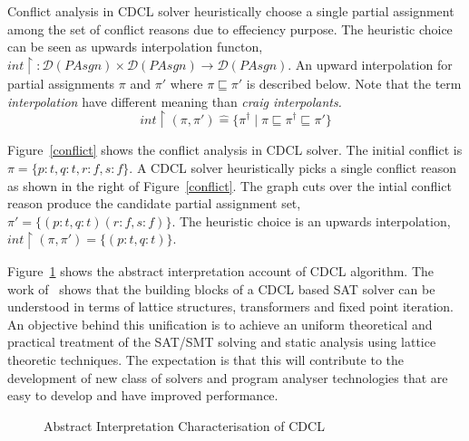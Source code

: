 Conflict analysis in CDCL solver heuristically choose a single partial
assignment among the set of conflict reasons due to effeciency purpose.
The heuristic choice can be seen as upwards interpolation functon, 
$int \upharpoonright \colon \mathcal{D}(PAsgn) \times \mathcal{D}(PAsgn)
\rightarrow \mathcal{D}(PAsgn)$. An upward interpolation for partial 
assignments $\pi$ and $\pi'$ where $\pi \sqsubseteq \pi'$ is described below. 
Note that the term \emph{interpolation} have different meaning than \emph{craig
interpolants.}
\[
  int \upharpoonright (\pi, \pi') \mathrel{\hat=} \{\pi^\dagger \mid \pi
 \sqsubseteq \pi^\dagger \sqsubseteq \pi'\}
\]
\begin{example}
Figure~\ref{conflict} shows the conflict analysis in CDCL solver. The initial
  conflict is $\pi = \{p:t,q:t,r:f,s:f\}$. A CDCL solver heuristically picks a single 
  conflict reason as shown in the right of Figure~\ref{conflict}. The graph cuts 
  over the intial conflict reason produce the candidate partial assignment set, 
  $\pi' = \{(p:t,q:t)(r:f,s:f)\}$. The heuristic choice is an upwards interpolation, 
  $int \upharpoonright (\pi, \pi') = \{(p:t,q:t)\}$.
\end{example}
%
Figure~\ref{fig:acdcl} shows the abstract interpretation account of CDCL
algorithm.  The work of~\cite{leo-thesis} shows that the building blocks 
of a CDCL based SAT solver can be understood in terms of lattice structures, 
transformers and fixed point iteration. An objective behind this unification is 
to achieve an uniform theoretical and practical treatment of the SAT/SMT solving 
and static analysis using lattice theoretic techniques.  The expectation is that
this will contribute to the development of new class of solvers and program
analyser technologies that are easy to develop and have improved performance. 
%
\begin{figure}[htbp]
\centering
\vspace*{-0.2cm}
\caption{Abstract Interpretation Characterisation of CDCL \label{fig:acdcl}}
\end{figure}

